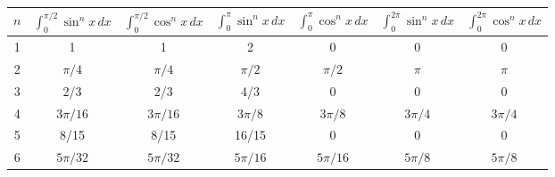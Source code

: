 \documentclass{article}
\begin{document}
\begin{multicols*}{2}
    \begin{tabular}{|c||c|c|c|c|c|c|}
        \hline
        \(n\) & \(\displaystyle \int_{0}^{\pi/2} \sin^{n} x\, dx\) & \(\displaystyle \int_{0}^{\pi/2} \cos^{n} x\, dx\) & \(\displaystyle \int_{0}^{\pi} \sin^{n} x\, dx\) & \(\displaystyle \int_{0}^{\pi} \cos^{n} x\, dx\) & \(\displaystyle \int_{0}^{2\pi} \sin^{n}x \, dx\) & \(\displaystyle \int_{0}^{2\pi} \cos^{n}x \, dx\) \\ \hline
        1     & 1                                                  & 1                                                  & 2                                                & 0                                                & 0                                                 & 0                                                 \\
        2     & \(\pi/4\)                                          & \(\pi/4\)                                          & \(\pi/2\)                                        & \(\pi/2\)                                        & \(\pi\)                                           & \(\pi\)                                           \\
        3     & 2/3                                                & 2/3                                                & 4/3                                              & 0                                                & 0                                                 & 0                                                 \\
        4     & \(3\pi/16\)                                        & \(3\pi/16\)                                        & \(3\pi/8\)                                       & \(3\pi/8\)                                       & \(3\pi/4\)                                        & \(3\pi/4\)                                        \\
        5     & 8/15                                               & 8/15                                               & 16/15                                            & 0                                                & 0                                                 & 0                                                 \\
        6     & \(5\pi/32\)                                        & \(5\pi/32\)                                        & \(5\pi/16\)                                      & \(5\pi/16\)                                      & \(5\pi/8\)                                        & \(5\pi/8\)                                        \\
        \hline
    \end{tabular}




\end{multicols*}
\end{document}
